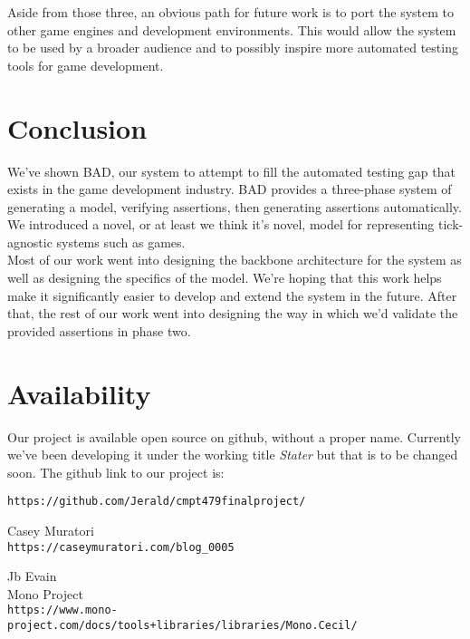 \documentclass[letterpaper,twocolumn,10pt]{article}
\begin{document}
Aside from those three, an obvious path for future work is to port the system to other game engines and development environments. This would allow the system to be used by a broader audience and to possibly inspire more automated testing tools for game development.

\section{Conclusion}

We've shown BAD, our system to attempt to fill the automated testing gap that exists in the game development industry. BAD provides a three-phase system of generating a model, verifying assertions, then generating assertions automatically. We introduced a novel, or at least we think it's novel, model for representing tick-agnostic systems such as games.\\

Most of our work went into designing the backbone architecture for the system as well as designing the specifics of the model. We're hoping that this work helps make it significantly easier to develop and extend the system in the future. After that, the rest of our work went into designing the way in which we'd validate the provided assertions in phase two.

\section{Availability}

Our project is available open source on github, without a proper name. Currently we've been developing it under the working title \textit{Stater} but that is to be changed soon. The github link to our project is:
\begin{center}
{\tt https://github.com/Jerald/cmpt479finalproject/}\\
\end{center}

\begin{thebibliography}{9}
    Casey Muratori\\
    \texttt{https://caseymuratori.com/blog\_0005}

    Jb Evain\\
    Mono Project\\
    \texttt{https://www.mono-project.com/docs/tools+libraries/libraries/Mono.Cecil/}
\end{thebibliography}






\theendnotes
\end{document}

